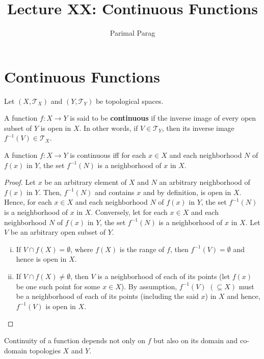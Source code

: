 \documentclass[a4paper,english,12pt]{article}
\begin{document}
\title{Lecture XX: Continuous Functions}
\author{Parimal Parag}
\maketitle

\section{Continuous Functions}
Let $(X,\mathcal{T}_X)$ and $(Y,\mathcal{T}_Y)$ be topological spaces. 
\begin{defn} A function $f:X\rightarrow Y$ is said to be \textbf{continuous} if the inverse image of every open subset of $Y$ is open in $X$. In other words, if $V\in \mathcal{T}_Y$, then  its inverse image $f^{-1}(V)\in \mathcal{T}_X$.
\end{defn}

\begin{prop}
A function $f:X\rightarrow Y$ is continuous iff for each $x \in X$ and each neighborhood $N$ of $f(x)$ in $Y$, the set $f^{-1}(N)$ is a neighborhood of $x$ in $X$.
\end{prop}
\begin{proof}
Let $x$ be an arbitrary element of $X$ and $N$ an arbitrary neighborhood of $f(x)$ in $Y$. Then, $f^{-1}(N)$ and contains $x$ and by definition, is open in $X$. Hence, for each $x \in X$ and each neighborhood $N$ of $f(x)$ in $Y$, the set $f^{-1}(N)$ is a neighborhood of $x$ in $X$.
Conversely, let for each $x \in X$ and each neighborhood $N$ of $f(x)$ in $Y$, the set $f^{-1}(N)$ is a neighborhood of $x$ in $X$. Let $V$ be an arbitrary open subset of $Y$. 
\begin{enumerate}[i)]
\item If $V\cap f(X)=\emptyset$, where $f(X)$ is the range of $f$, then $f^{-1}(V)=\emptyset$ and hence is open in $X$.
\item If $V\cap f(X)\neq \emptyset$, then $V$ is a neighborhood of each of its points (let $f(x)$ be one such point for some $x\in X$). By assumption, $f^{-1}(V)$ $(\subseteq X)$ must be a neighborhood of each of its points (including the said $x$) in $X$ and hence, $f^{-1}(V)$ is open in $X$.
\end{enumerate}
\end{proof}

\begin{note} Continuity of a function depends not only on $f$ but also on its domain and co-domain topologies $X$ and $Y$.
\end{note}
\end{document}
